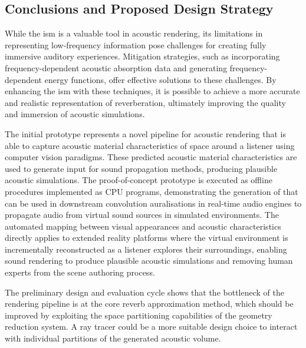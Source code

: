\subsection{Conclusions and Proposed Design Strategy}
While the \acrshort{ism} is a valuable tool in acoustic rendering, its limitations in representing low-frequency information pose challenges for creating fully immersive auditory experiences. Mitigation strategies, such as incorporating frequency-dependent acoustic absorption data and generating frequency-dependent energy functions, offer effective solutions to these challenges. By enhancing the \acrshort{ism} with these techniques, it is possible to achieve a more accurate and realistic representation of reverberation, ultimately improving the quality and immersion of acoustic simulations.\par
The initial prototype represents a novel pipeline for acoustic rendering that is able to capture acoustic material characteristics of space around a listener using computer vision paradigms. These predicted acoustic material characteristics are used to generate input for sound propagation methods, producing plausible acoustic simulations. The proof-of-concept prototype is executed as offline procedures implemented as CPU programs, demonstrating the generation of  that can be used in downstream convolution auralisations in real-time audio engines to propagate audio from virtual sound sources in simulated environments. The automated mapping between visual appearances and acoustic characteristics directly applies to extended reality platforms where the virtual environment is incrementally reconstructed as a listener explores their surroundings, enabling sound rendering to produce plausible acoustic simulations and removing human experts from the scene authoring process.\par
The preliminary design and evaluation cycle shows that the bottleneck of the rendering pipeline is at the core reverb approximation method, which should be improved by exploiting the space partitioning capabilities of the geometry reduction system. A ray tracer could be a more suitable design choice to interact with individual partitions of the generated acoustic volume. \par

